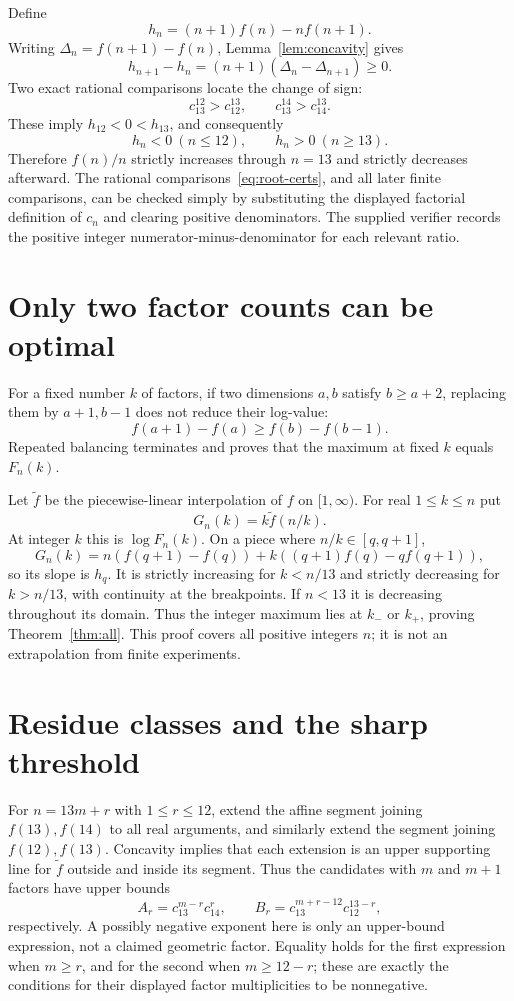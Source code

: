 \documentclass[11pt]{article}
\theoremstyle{remark}\newtheorem{remark}[theorem]{Remark}
\begin{document}
Define
\[
 h_n=(n+1)f(n)-nf(n+1).
\]
Writing $\Delta_n=f(n+1)-f(n)$, Lemma~\ref{lem:concavity} gives
\[
 h_{n+1}-h_n=(n+1)(\Delta_n-\Delta_{n+1})\ge0.
\]
Two exact rational comparisons locate the change of sign:
\begin{equation}\label{eq:root-certs}
 c_{13}^{12}>c_{12}^{13},\qquad c_{13}^{14}>c_{14}^{13}.
\end{equation}
These imply $h_{12}<0<h_{13}$, and consequently
\[
 h_n<0\ (n\le12),\qquad h_n>0\ (n\ge13).
\]
Therefore $f(n)/n$ strictly increases through $n=13$ and strictly decreases afterward. The rational comparisons~\eqref{eq:root-certs}, and all later finite comparisons, can be checked simply by substituting the displayed factorial definition of $c_n$ and clearing positive denominators. The supplied verifier records the positive integer numerator-minus-denominator for each relevant ratio.

\section{Only two factor counts can be optimal}
For a fixed number $k$ of factors, if two dimensions $a,b$ satisfy $b\ge a+2$, replacing them by $a+1,b-1$ does not reduce their log-value:
\[
 f(a+1)-f(a)\ge f(b)-f(b-1).
\]
Repeated balancing terminates and proves that the maximum at fixed $k$ equals $F_n(k)$.

Let $\widetilde f$ be the piecewise-linear interpolation of $f$ on $[1,\infty)$. For real $1\le k\le n$ put
\[
 G_n(k)=k\widetilde f(n/k).
\]
At integer $k$ this is $\log F_n(k)$. On a piece where $n/k\in[q,q+1]$,
\[
 G_n(k)=n(f(q+1)-f(q))+k((q+1)f(q)-qf(q+1)),
\]
so its slope is $h_q$. It is strictly increasing for $k<n/13$ and strictly decreasing for $k>n/13$, with continuity at the breakpoints. If $n<13$ it is decreasing throughout its domain. Thus the integer maximum lies at $k_-$ or $k_+$, proving Theorem~\ref{thm:all}. This proof covers all positive integers $n$; it is not an extrapolation from finite experiments.

\section{Residue classes and the sharp threshold}
For $n=13m+r$ with $1\le r\le12$, extend the affine segment joining $f(13),f(14)$ to all real arguments, and similarly extend the segment joining $f(12),f(13)$. Concavity implies that each extension is an upper supporting line for $\widetilde f$ outside and inside its segment. Thus the candidates with $m$ and $m+1$ factors have upper bounds
\[
 A_r=c_{13}^{m-r}c_{14}^{r},\qquad
 B_r=c_{13}^{m+r-12}c_{12}^{13-r},
\]
respectively. A possibly negative exponent here is only an upper-bound expression, not a claimed geometric factor. Equality holds for the first expression when $m\ge r$, and for the second when $m\ge12-r$; these are exactly the conditions for their displayed factor multiplicities to be nonnegative.
\end{document}
